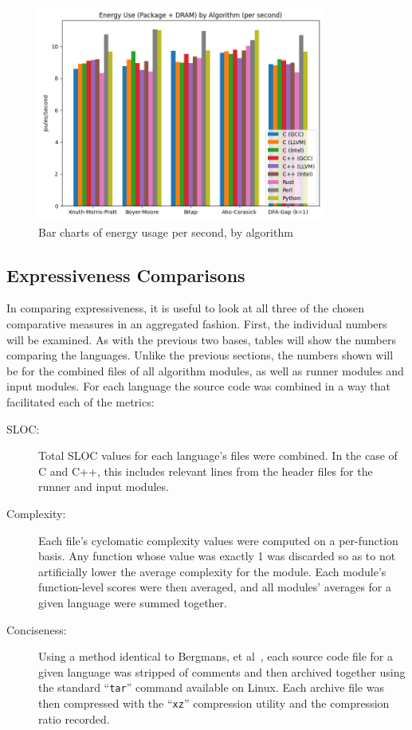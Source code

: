 \begin{figure}
	\centering
	\includegraphics[width=0.85\textwidth]{figures/power_per_sec.png}
	\caption{Bar charts of energy usage per second, by algorithm}
	\label{fig:graph:power_per_sec}
\end{figure}

\subsection{Expressiveness Comparisons}
\label{subsec:expr_comp}

In comparing expressiveness, it is useful to look at all three of the chosen comparative measures in an aggregated fashion. First, the individual numbers will be examined. As with the previous two bases, tables will show the numbers comparing the languages. Unlike the previous sections, the numbers shown will be for the combined files of all algorithm modules, as well as runner modules and input modules. For each language the source code was combined in a way that facilitated each of the metrics:

\begin{description}
\item[SLOC:] Total SLOC values for each language's files were combined. In the case of C and C++, this includes relevant lines from the header files for the runner and input modules.
\item[Complexity:] Each file's cyclomatic complexity values were computed on a per-function basis. Any function whose value was exactly 1 was discarded so as to not artificially lower the average complexity for the module. Each module's function-level scores were then averaged, and all modules' averages for a given language were summed together.
\item[Conciseness:] Using a method identical to Bergmans, et al~\cite{bergmans.et.al.2021}, each source code file for a given language was stripped of comments and then archived together using the standard ``\texttt{tar}'' command available on Linux. Each archive file was then compressed with the ``\texttt{xz}'' compression utility and the compression ratio recorded.
\end{description}

